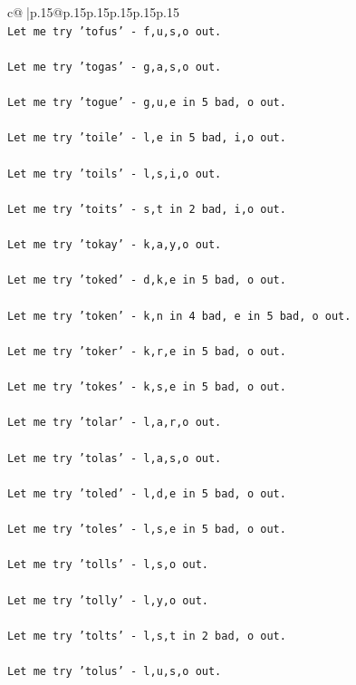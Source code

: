\documentclass{article}
\begin{document}
{\begin{supertabular}{c@{$\;$}|p{.15\linewidth}@{}p{.15\linewidth}p{.15\linewidth}p{.15\linewidth}p{.15\linewidth}p{.15\linewidth}}
{{{\\ 
\texttt{Let me try 'tofus' {-} f,u,s,o out. } \\
\\ 
\texttt{Let me try 'togas' {-} g,a,s,o out. } \\
\\ 
\texttt{Let me try 'togue' {-} g,u,e in 5 bad, o out. } \\
\\ 
\texttt{Let me try 'toile' {-} l,e in 5 bad, i,o out. } \\
\\ 
\texttt{Let me try 'toils' {-} l,s,i,o out. } \\
\\ 
\texttt{Let me try 'toits' {-} s,t in 2 bad, i,o out. } \\
\\ 
\texttt{Let me try 'tokay' {-} k,a,y,o out. } \\
\\ 
\texttt{Let me try 'toked' {-} d,k,e in 5 bad, o out. } \\
\\ 
\texttt{Let me try 'token' {-} k,n in 4 bad, e in 5 bad, o out. } \\
\\ 
\texttt{Let me try 'toker' {-} k,r,e in 5 bad, o out. } \\
\\ 
\texttt{Let me try 'tokes' {-} k,s,e in 5 bad, o out. } \\
\\ 
\texttt{Let me try 'tolar' {-} l,a,r,o out. } \\
\\ 
\texttt{Let me try 'tolas' {-} l,a,s,o out. } \\
\\ 
\texttt{Let me try 'toled' {-} l,d,e in 5 bad, o out. } \\
\\ 
\texttt{Let me try 'toles' {-} l,s,e in 5 bad, o out. } \\
\\ 
\texttt{Let me try 'tolls' {-} l,s,o out. } \\
\\ 
\texttt{Let me try 'tolly' {-} l,y,o out. } \\
\\ 
\texttt{Let me try 'tolts' {-} l,s,t in 2 bad, o out. } \\
\\ 
\texttt{Let me try 'tolus' {-} l,u,s,o out. } \\
}}}
\end{supertabular}}
\end{document}
